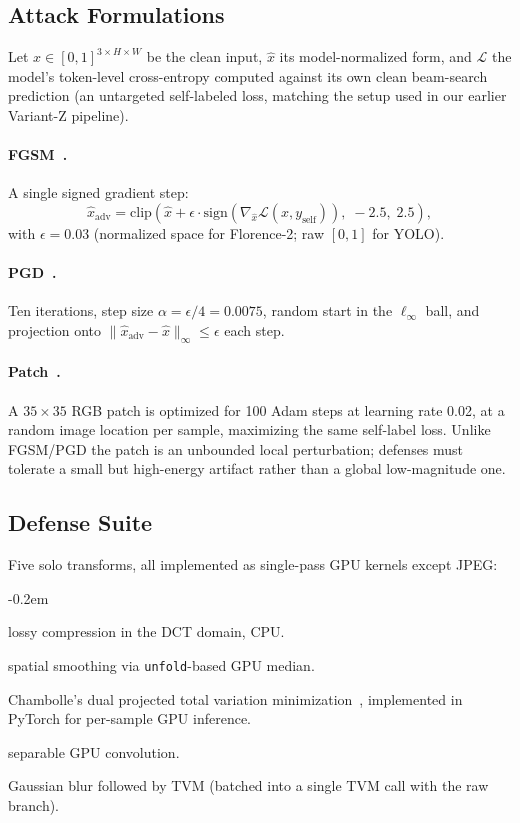 \documentclass[10pt,twocolumn,letterpaper]{article}
\begin{document}
\subsection{Attack Formulations}
Let $x\in[0,1]^{3\times H\times W}$ be the clean input, $\hat{x}$ its model-normalized form, and $\mathcal{L}$ the model's token-level cross-entropy computed against its own clean beam-search prediction (an untargeted self-labeled loss, matching the setup used in our earlier Variant-Z pipeline).

\paragraph{FGSM~\cite{goodfellow2014explaining}.} A single signed gradient step:
\begin{equation}
\hat{x}_{\text{adv}} = \mathrm{clip}\!\left(\hat{x} + \epsilon\cdot\mathrm{sign}\!\left(\nabla_{\hat{x}}\mathcal{L}(\hat{x},y_{\text{self}})\right),\; -2.5,\; 2.5\right),
\end{equation}
with $\epsilon{=}0.03$ (normalized space for Florence-2; raw $[0,1]$ for YOLO).

\paragraph{PGD~\cite{madry2017towards}.} Ten iterations, step size $\alpha{=}\epsilon/4{=}0.0075$, random start in the $\ell_\infty$ ball, and projection onto $\|\hat{x}_{\text{adv}}-\hat{x}\|_\infty\le\epsilon$ each step.

\paragraph{Patch~\cite{brown2017adversarial}.} A $35\times35$ RGB patch is optimized for 100 Adam steps at learning rate 0.02, at a random image location per sample, maximizing the same self-label loss. Unlike FGSM/PGD the patch is an unbounded local perturbation; defenses must tolerate a small but high-energy artifact rather than a global low-magnitude one.

\subsection{Defense Suite}
Five solo transforms, all implemented as single-pass GPU kernels except JPEG:
\begin{description}
\itemsep -0.2em
\item[JPEG ($q{=}75$):] lossy compression in the DCT domain, CPU.
\item[Median ($3{\times}3$):] spatial smoothing via \texttt{unfold}-based GPU median.
\item[TVM ($w{=}0.05$, 200 iters):] Chambolle's dual projected total variation minimization~\cite{chambolle2004tvm}, implemented in PyTorch for per-sample GPU inference.
\item[Gaussian ($\sigma{=}1.0$):] separable GPU convolution.
\item[Blur+TVM:] Gaussian blur followed by TVM (batched into a single TVM call with the raw branch).
\end{description}
\end{document}

